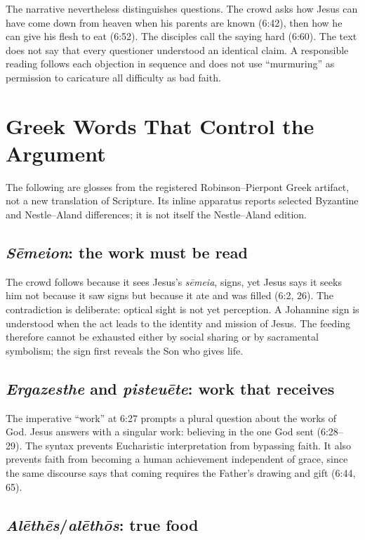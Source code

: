 \begin{deepstudy}
The narrative nevertheless distinguishes questions. The crowd asks how Jesus
can have come down from heaven when his parents are known (6:42), then how he
can give his flesh to eat (6:52). The disciples call the saying hard (6:60).
The text does not say that every questioner understood an identical claim. A
responsible reading follows each objection in sequence and does not use
``murmuring'' as permission to caricature all difficulty as bad faith.

\section{Greek Words That Control the Argument}

The following are glosses from the registered Robinson--Pierpont Greek
artifact, not a new translation of Scripture. Its inline apparatus reports
selected Byzantine and Nestle--Aland differences; it is not itself the
Nestle--Aland edition.

\subsection{\emph{S\=emeion}: the work must be read}

The crowd follows because it sees Jesus's \emph{s\=emeia}, signs, yet Jesus says
it seeks him not because it saw signs but because it ate and was filled
(6:2, 26). The contradiction is deliberate: optical sight is not yet
perception. A Johannine sign is understood when the act leads to the identity
and mission of Jesus. The feeding therefore cannot be exhausted either by
social sharing or by sacramental symbolism; the sign first reveals the Son who
gives life.

\subsection{\emph{Ergazesthe} and \emph{pisteu\=ete}: work that receives}

The imperative ``work'' at 6:27 prompts a plural question about the works of
God. Jesus answers with a singular work: believing in the one God sent
(6:28--29). The syntax prevents Eucharistic interpretation from bypassing
faith. It also prevents faith from becoming a human achievement independent of
grace, since the same discourse says that coming requires the Father's drawing
and gift (6:44, 65).

\subsection{\emph{Al\=eth\=es}/\emph{al\=eth\=os}: true food}


\end{deepstudy}
